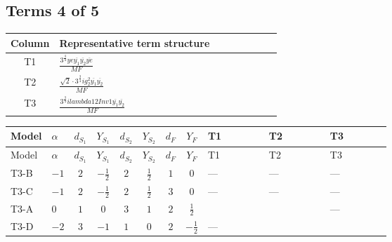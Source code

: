 \documentclass[8pt]{article}
\begin{document}
\begin{landscape}
\subsection*{Terms 4 of 5}
\begin{center}
\begin{tabular}{@{}c >{\raggedright\arraybackslash}p{0.82\linewidth}@{}}
\toprule
Column & Representative term structure \\
\midrule
T1 & \(\displaystyle \frac{3^{\frac{3}{4}} ye \overline{y_{1}} \overline{y_{2}} \overline{ye}}{MF}\) \\
\midrule
T2 & \(\displaystyle \frac{\sqrt{2} \cdot 3^{\frac{3}{4}} i g_{2}^{2} \overline{y_{1}} \overline{y_{2}}}{MF}\) \\
\midrule
T3 & \(\displaystyle \frac{3^{\frac{3}{4}} i lambda12Inv1 \overline{y_{1}} \overline{y_{2}}}{MF}\) \\
\midrule
\bottomrule
\end{tabular}
\end{center}
\smallskip
\tiny
\begin{longtable}{@{}llcccccc >{\raggedright\arraybackslash}p{0.21\linewidth} >{\raggedright\arraybackslash}p{0.21\linewidth} >{\raggedright\arraybackslash}p{0.21\linewidth}@{}}
\toprule
Model & $\alpha$ & $d_{S_1}$ & $Y_{S_1}$ & $d_{S_2}$ & $Y_{S_2}$ & $d_F$ & $Y_F$ & T1 & T2 & T3 \\
\midrule
\endfirsthead
\toprule
Model & $\alpha$ & $d_{S_1}$ & $Y_{S_1}$ & $d_{S_2}$ & $Y_{S_2}$ & $d_F$ & $Y_F$ & T1 & T2 & T3 \\
\midrule
\endhead
T3-B & $-1$ & $2$ & $-\frac{1}{2}$ & $2$ & $\frac{1}{2}$ & $1$ & $0$ & --- & --- & --- \\
\midrule
T3-C & $-1$ & $2$ & $-\frac{1}{2}$ & $2$ & $\frac{1}{2}$ & $3$ & $0$ & --- & --- & --- \\
\midrule
T3-A & $0$ & $1$ & $0$ & $3$ & $1$ & $2$ & $\frac{1}{2}$ & \scriptsize\adjustbox{max width=\linewidth}{$\begin{gathered} \frac{3^{\frac{3}{4}} ye \overline{y_{1}} \overline{y_{2}} \overline{ye}}{12 MF}\end{gathered}$} & \scriptsize\adjustbox{max width=\linewidth}{$\begin{gathered} - \frac{\sqrt{2} \cdot 3^{\frac{3}{4}} i g_{2}^{2} \overline{y_{1}} \overline{y_{2}}}{3 MF}\end{gathered}$} & --- \\
\midrule
T3-D & $-2$ & $3$ & $-1$ & $1$ & $0$ & $2$ & $-\frac{1}{2}$ & --- & \scriptsize\adjustbox{max width=\linewidth}{$\begin{gathered} \frac{\sqrt{2} \cdot 3^{\frac{3}{4}} i g_{2}^{2} \overline{y_{1}} \overline{y_{2}}}{3 MF}\end{gathered}$} & \scriptsize\adjustbox{max width=\linewidth}{$\begin{gathered} \frac{3^{\frac{3}{4}} i lambda12Inv1 \overline{y_{1}} \overline{y_{2}}}{6 MF}\end{gathered}$} \\

\end{longtable}
\end{landscape}
\end{document}

